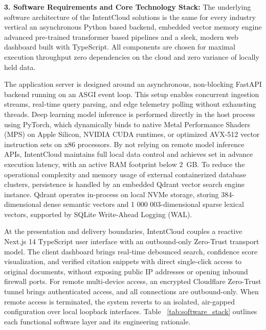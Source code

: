 \documentclass[a4paper,12pt]{article}
\begin{document}
\noindent\textbf{3. Software Requirements and Core Technology Stack:}
The underlying software architecture of the IntentCloud solutions is the same for every industry vertical an asynchronous Python based backend, embedded vector memory engine advanced pre-trained transformer based pipelines and a sleek, modern web dashboard built with TypeScript. All components are chosen for maximal execution throughput zero dependencies on the cloud and zero variance of locally held data.

The application server is designed around an asynchronous, non-blocking FastAPI backend running on an ASGI event loop. This setup enables concurrent ingestion streams, real-time query parsing, and edge telemetry polling without exhausting threads. Deep learning model inference is performed directly in the host process using PyTorch, which dynamically binds to native Metal Performance Shaders (MPS) on Apple Silicon, NVIDIA CUDA runtimes, or optimized AVX-512 vector instruction sets on x86 processors. By not relying on remote model inference APIs, IntentCloud maintains full local data control and achieves set in advance execution latency, with an active RAM footprint below 2~GB. To reduce the operational complexity and memory usage of external containerized database clusters, persistence is handled by an embedded Qdrant vector search engine instance. Qdrant operates in-process on local NVMe storage, storing 384-dimensional dense semantic vectors and 1 000 003-dimensional sparse lexical vectors, supported by SQLite Write-Ahead Logging (WAL).

At the presentation and delivery boundaries, IntentCloud couples a reactive Next.js 14 TypeScript user interface with an outbound-only Zero-Trust transport model. The client dashboard brings real-time debounced search, confidence score visualization, and verified citation snippets with direct single-click access to original documents, without exposing public IP addresses or opening inbound firewall ports. For remote multi-device access, an encrypted Cloudflare Zero-Trust tunnel brings authenticated access, and all connections are outbound-only. When remote access is terminated, the system reverts to an isolated, air-gapped configuration over local loopback interfaces. Table ~\ref{tab:software_stack}  outlines each functional software layer and its engineering rationale.
\end{document}

